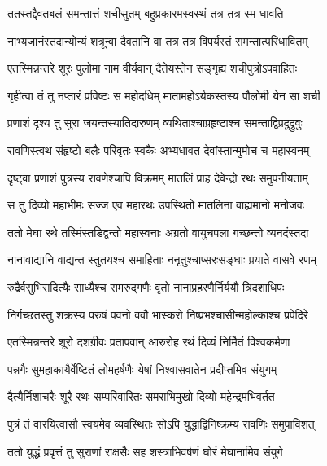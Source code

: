 \twolineshloka
{ततस्तद्दैवतबलं समन्तात्तं शचीसुतम्}
{बहुप्रकारमस्वस्थं तत्र तत्र स्म धावति} %

\twolineshloka
{नाभ्यजानंस्तदान्योन्यं शत्रून्वा दैवतानि वा}
{तत्र तत्र विपर्यस्तं समन्तात्परिधावितम्} %

\twolineshloka
{एतस्मिन्नन्तरे शूरः पुलोमा नाम वीर्यवान्}
{दैतेयस्तेन सङ्गृह्य शचीपुत्रोऽपवाहितः} %

\twolineshloka
{गृहीत्वा तं तु नप्तारं प्रविष्टः स महोदधिम्}
{मातामहोऽर्यकस्तस्य पौलोमी येन सा शची} %

\twolineshloka
{प्रणाशं दृश्य तु सुरा जयन्तस्यातिदारुणम्}
{व्यथिताश्चाप्रहृष्टाश्च समन्ताद्विप्रदुद्रुवुः} %

\twolineshloka
{रावणिस्त्वथ संहृष्टो बलैः परिवृतः स्वकैः}
{अभ्यधावत देवांस्तान्मुमोच च महास्वनम्} %

\twolineshloka
{दृष्ट्वा प्रणाशं पुत्रस्य रावणेश्चापि विक्रमम्}
{मातलिं प्राह देवेन्द्रो रथः समुपनीयताम्} %

\twolineshloka
{स तु दिव्यो महाभीमः सज्ज एव महारथः}
{उपस्थितो मातलिना वाह्यमानो मनोजवः} %

\twolineshloka
{ततो मेघा रथे तस्मिंस्तडिद्वन्तो महास्वनाः}
{अग्रतो वायुचपला गच्छन्तो व्यनदंस्तदा} %

\twolineshloka
{नानावाद्यानि वाद्यन्त स्तुतयश्च समाहिताः}
{ननृतुश्चाप्सरःसङ्घाः प्रयाते वासवे रणम्} %

\twolineshloka
{रुद्रैर्वसुभिरादित्यैः साध्यैश्च समरुद्गणैः}
{वृतो नानाप्रहरणैर्निर्ययौ त्रिदशाधिपः} %

\twolineshloka
{निर्गच्छतस्तु शक्रस्य परुषं पवनो ववौ}
{भास्करो निष्प्रभश्चासीन्महोल्काश्च प्रपेदिरे} %

\twolineshloka
{एतस्मिन्नन्तरे शूरो दशग्रीवः प्रतापवान्}
{आरुरोह रथं दिव्यं निर्मितं विश्वकर्मणा} %

\twolineshloka
{पन्नगैः सुमहाकायैर्वेष्टितं लोमहर्षणैः}
{येषां निश्वासवातेन प्रदीप्तमिव संयुगम्} %

\twolineshloka
{दैत्यैर्निशाचरैः शूरै रथः सम्परिवारितः}
{समराभिमुखो दिव्यो महेन्द्रमभिवर्तत} %

\twolineshloka
{पुत्रं तं वारयित्वासौ स्वयमेव व्यवस्थितः}
{सोऽपि युद्धाद्विनिष्क्रम्य रावणिः समुपाविशत्} %

\twolineshloka
{ततो युद्धं प्रवृत्तं तु सुराणां राक्षसैः सह}
{शस्त्राभिवर्षणं घोरं मेघानामिव संयुगे} %

